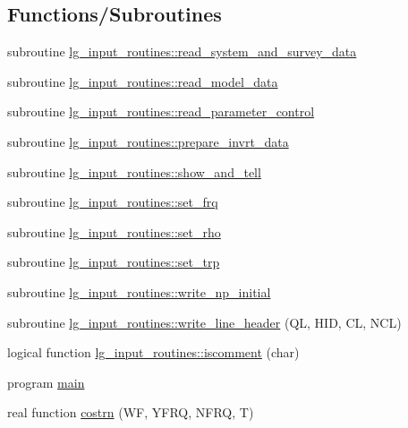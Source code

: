 \subsection*{Functions/\+Subroutines}
\begin{DoxyCompactItemize}
\item 
subroutine \hyperlink{namespacelg__input__routines_a80feb058541516d5a6327fb6c344bbbd}{lg\+\_\+input\+\_\+routines\+::read\+\_\+system\+\_\+and\+\_\+survey\+\_\+data}
\item 
subroutine \hyperlink{namespacelg__input__routines_a39e1903280f0492197231ab5fa752f21}{lg\+\_\+input\+\_\+routines\+::read\+\_\+model\+\_\+data}
\item 
subroutine \hyperlink{namespacelg__input__routines_a123f91865ea388eca78b77b0d625aa8c}{lg\+\_\+input\+\_\+routines\+::read\+\_\+parameter\+\_\+control}
\item 
subroutine \hyperlink{namespacelg__input__routines_a3118d974d52f2c98169709e887ceb344}{lg\+\_\+input\+\_\+routines\+::prepare\+\_\+invrt\+\_\+data}
\item 
subroutine \hyperlink{namespacelg__input__routines_a46a4ddc163c46adad59e863dadde86a3}{lg\+\_\+input\+\_\+routines\+::show\+\_\+and\+\_\+tell}
\item 
subroutine \hyperlink{namespacelg__input__routines_a836674acd30d52d3aa973722014aaa9f}{lg\+\_\+input\+\_\+routines\+::set\+\_\+frq}
\item 
subroutine \hyperlink{namespacelg__input__routines_a74107bd43614b32d8679e91def53e94d}{lg\+\_\+input\+\_\+routines\+::set\+\_\+rho}
\item 
subroutine \hyperlink{namespacelg__input__routines_aff8e77512771c5a25793784a8185d5b0}{lg\+\_\+input\+\_\+routines\+::set\+\_\+trp}
\item 
subroutine \hyperlink{namespacelg__input__routines_a1e34012960c952d22446828d97881001}{lg\+\_\+input\+\_\+routines\+::write\+\_\+np\+\_\+initial}
\item 
subroutine \hyperlink{namespacelg__input__routines_abb4589f0c8ad2d2d88f0f52aac5462e6}{lg\+\_\+input\+\_\+routines\+::write\+\_\+line\+\_\+header} (QL, H\+ID, CL, N\+CL)
\item 
logical function \hyperlink{namespacelg__input__routines_a8433a2003dce3e9ebdd1aa0a11e16538}{lg\+\_\+input\+\_\+routines\+::iscomment} (char)
\item 
program \hyperlink{Leroi_8f90_a8ec2266d83cd6c0b762cbcbc92c0af3d}{main}
\item 
real function \hyperlink{Leroi_8f90_a12a40dde1170214455093566ef5e8bb4}{costrn} (WF, Y\+F\+RQ, N\+F\+RQ, T)

\end{DoxyCompactItemize}
